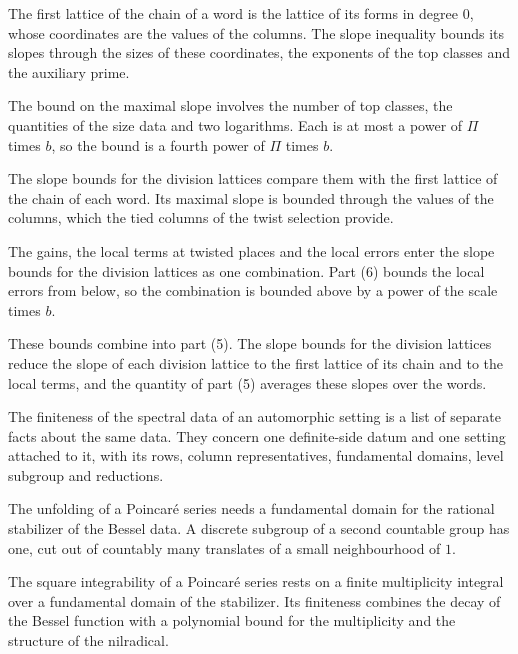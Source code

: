 The first lattice of the chain of a word is the lattice of its forms in degree
$0$, whose coordinates are the values of the columns. The slope inequality
bounds its slopes through the sizes of these coordinates, the exponents of the
top classes and the auxiliary prime.

The bound on the maximal slope involves the number of top classes, the
quantities of the size data and two logarithms. Each is at most a power of
$\Pi$ times $b$, so the bound is a fourth power of $\Pi$ times $b$.

The slope bounds for the division lattices compare them with the first
lattice of the chain of each word. Its maximal slope is bounded through the
values of the columns, which the tied columns of the twist selection provide.

The gains, the local terms at twisted places and the local errors enter the
slope bounds for the division lattices as one combination. Part (6) bounds
the local errors from below, so the combination is bounded above by a power
of the scale times $b$.

These bounds combine into part (5). The slope bounds for the division lattices
reduce the slope of each division lattice to the first lattice of its chain
and to the local terms, and the quantity of part (5) averages these slopes
over the words.

The finiteness of the spectral data of an automorphic setting is a list of
separate facts about the same data. They concern one definite-side datum and
one setting attached to it, with its rows, column representatives, fundamental
domains, level subgroup and reductions.

The unfolding of a Poincaré series needs a fundamental domain for the rational stabilizer of the Bessel
data. A discrete subgroup of a second countable group has one, cut out of countably many translates of a
small neighbourhood of $1$.

The square integrability of a Poincaré series rests on a finite multiplicity integral over a fundamental
domain of the stabilizer. Its finiteness combines the decay of the Bessel function with a polynomial
bound for the multiplicity and the structure of the nilradical.


